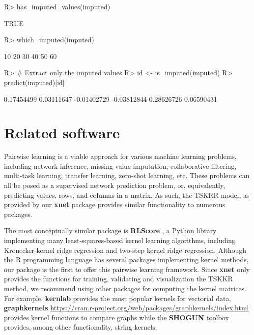 \documentclass[
]{article}
\begin{document}
\begin{CodeChunk}

\begin{CodeInput}
R> has_imputed_values(imputed)
\end{CodeInput}

\begin{CodeOutput}
[1] TRUE
\end{CodeOutput}

\begin{CodeInput}
R> which_imputed(imputed)
\end{CodeInput}

\begin{CodeOutput}
[1] 10 20 30 40 50 60
\end{CodeOutput}

\begin{CodeInput}
R> # Extract only the imputed values
R> id <- is_imputed(imputed)
R> predict(imputed)[id]
\end{CodeInput}

\begin{CodeOutput}
[1]  0.17454499  0.03111647 -0.01402729 -0.03812844  0.28626726  0.06590431
\end{CodeOutput}
\end{CodeChunk}

\hypertarget{related-software}{%
\section{Related software}\label{related-software}}

\label{sec:relatedsoftware}

Pairwise learning is a viable approach for various machine learning
problems, including network inference, missing value imputation,
collaborative filtering, multi-task learning, transfer learning,
zero-shot learning, etc. These problems can all be posed as a supervised
network prediction problem, or, equivalently, predicting values, rows,
and columns in a matrix. As such, the TSKRR model, as provided by our
\textbf{xnet} package provides similar functionality to numerous
packages.

The most conceptually similar package is \textbf{RLScore}
\citep{Pahikkala2016}, a Python library implementing many
least-squares-based kernel learning algorithms, including
Kronecker-kernel ridge regression and two-step kernel ridge regression.
Although the R programming language has several packages implementing
kernel methods, our package is the first to offer this pairwise learning
framework. Since \textbf{xnet} only provides the functions for training,
validating and visualization the TSKKR method, we recommend using other
packages for computing the kernel matrices. For example,
\textbf{kernlab} \citep{Karatzoglou2004} provides the most popular
kernels for vectorial data, \textbf{graphkernels}
\url{https://cran.r-project.org/web/packages/graphkernels/index.html}
provides kernel functions to compare graphs while the \textbf{SHOGUN}
toolbox \citep{Sonnenburg2010} provides, among other functionality,
string kernels.
\end{document}
